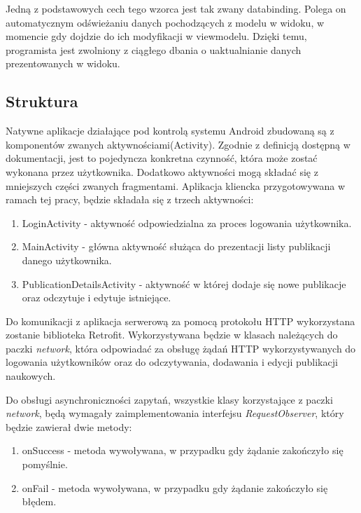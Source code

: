 \documentclass[a4paper,12pt,twoside,openany]{report}
\begin{document}
Jedną z podstawowych cech tego wzorca jest tak zwany databinding. Polega on automatycznym odświeżaniu danych pochodzących z modelu w widoku, w momencie gdy dojdzie do ich modyfikacji w viewmodelu. Dzięki temu, programista jest zwolniony z ciągłego dbania o uaktualnianie danych prezentowanych w widoku.

\newpage
\subsection{Struktura}
Natywne aplikacje działające pod kontrolą systemu Android zbudowaną są z komponentów zwanych aktywnościami(Activity). Zgodnie z definicją dostępną w dokumentacji, jest to  pojedyncza konkretna czynność, która może zostać wykonana przez użytkownika. Dodatkowo aktywności mogą składać się z mniejszych części zwanych fragmentami. Aplikacja kliencka przygotowywana w ramach tej pracy, będzie składała się z trzech aktywności:
\begin{enumerate}
	\item LoginActivity - aktywność odpowiedzialna za proces logowania użytkownika.
	
	\item MainActivity - główna aktywność służąca do prezentacji listy publikacji danego użytkownika. 

	\item PublicationDetailsActivity - aktywność w której dodaje się nowe publikacje oraz odczytuje i edytuje istniejące.

\end{enumerate}

Do komunikacji z aplikacja serwerową za pomocą protokołu HTTP wykorzystana zostanie biblioteka Retrofit. Wykorzystywana będzie w klasach należących do paczki \textit{network}, która odpowiadać za obsługę żądań HTTP wykorzystywanych do logowania użytkowników oraz do odczytywania, dodawania i edycji publikacji naukowych. 

Do obsługi asynchroniczności zapytań, wszystkie klasy korzystające z paczki \textit{network}, będą wymagały zaimplementowania interfejsu \textit{RequestObserver}, który będzie zawierał dwie metody:
\begin{enumerate}
	\item onSuccess - metoda wywoływana, w przypadku gdy żądanie zakończyło się pomyślnie.
	
	\item onFail - metoda wywoływana, w przypadku gdy żądanie zakończyło się błędem.
\end{enumerate}
\end{document}
